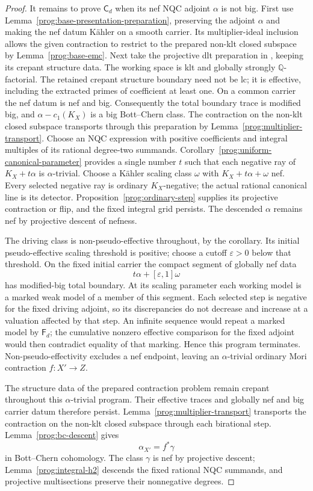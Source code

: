 \begin{proof}
It remains to prove $\mathsf C_d$ when its nef NQC adjoint $\alpha$
is not big. First use
Lemma~\ref{prog:base-presentation-preparation}, preserving the
adjoint $\alpha$ and making the nef datum K\"ahler on a smooth
carrier. Its multiplier-ideal inclusion allows the given contraction
to restrict to the prepared non-klt closed subspace by
Lemma~\ref{prog:base-emc}. Next take the projective dlt preparation
in \cite[Section~6]{HX}, keeping its crepant structure data. The
working space is klt and globally strongly $\mathbb Q$-factorial.
The retained crepant structure boundary need not be lc; it is
effective, including the extracted primes of coefficient at least one. On a common carrier the nef datum is
nef and big. Consequently the total boundary trace is modified big,
and $\alpha-c_1(K_X)$ is a big Bott--Chern class. The contraction on
the non-klt closed subspace transports through this preparation by
Lemma~\ref{prog:multiplier-transport}. Choose an NQC expression with
positive coefficients and integral multiples of its rational
degree-two summands. Corollary~\ref{prog:uniform-canonical-parameter}
provides a single number $t$ such that each negative ray of
$K_X+t\alpha$ is $\alpha$-trivial. Choose a K\"ahler scaling class
$\omega$ with $K_X+t\alpha+\omega$ nef. Every selected negative
ray is ordinary $K_X$-negative; the actual rational canonical line
is its detector. Proposition~\ref{prog:ordinary-step} supplies its
projective contraction or flip, and the fixed integral grid persists.
The descended $\alpha$ remains nef by projective descent of nefness.

The driving class is non-pseudo-effective throughout, by the
corollary. Its initial pseudo-effective scaling threshold is positive;
choose a cutoff $\varepsilon>0$ below that threshold. On the fixed
initial carrier the compact segment of globally nef data
\[
                    t\alpha+[\varepsilon,1]\omega
\]
has modified-big total boundary. At its scaling parameter each working
model is a marked weak model of a member of this segment. Each selected
step is negative for the fixed driving adjoint, so its discrepancies
do not decrease and increase at a valuation affected by that step.
An infinite sequence would repeat a marked model by $\mathsf F_d$;
the cumulative nonzero effective comparison for the fixed adjoint
would then contradict equality of that marking. Hence this program
terminates. Non-pseudo-effectivity excludes a nef endpoint, leaving
an $\alpha$-trivial ordinary Mori contraction $f:X'\to Z$.

The structure data of the prepared contraction problem remain
crepant throughout this $\alpha$-trivial program. Their effective
traces and globally nef and big carrier datum therefore persist.
Lemma~\ref{prog:multiplier-transport} transports the contraction on
the non-klt closed subspace through each birational step.
Lemma~\ref{prog:bc-descent} gives
\[
                         \alpha_{X'}=f^*\gamma
\]
in Bott--Chern cohomology. The class $\gamma$ is nef by projective
descent; Lemma~\ref{prog:integral-h2} descends the fixed rational
NQC summands, and projective multisections preserve their
nonnegative degrees.


\end{proof}
